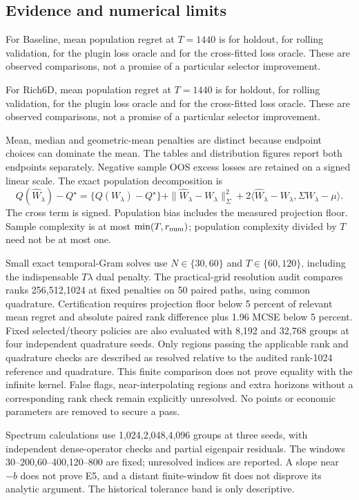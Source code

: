 \subsection{Evidence and numerical limits}
For Baseline, mean population regret at $T=1440$ is \simNumberA{} for holdout, \simNumberB{} for rolling validation, \simNumberC{} for the plugin loss oracle and \simNumberD{} for the cross-fitted loss oracle. These are observed comparisons, not a promise of a particular selector improvement.

For Rich6D, mean population regret at $T=1440$ is \simNumberE{} for holdout, \simNumberF{} for rolling validation, \simNumberG{} for the plugin loss oracle and \simNumberH{} for the cross-fitted loss oracle. These are observed comparisons, not a promise of a particular selector improvement.


Mean, median and geometric-mean penalties are distinct because endpoint choices
can dominate the mean. The tables and distribution figures report both endpoints
separately. Negative sample OOS excess losses are retained on a signed linear
scale. The exact population decomposition is
\[
Q(\widehat W_\lambda)-Q^\star
=\{Q(W_\lambda)-Q^\star\}
+\|\widehat W_\lambda-W_\lambda\|_\Sigma^2
+2\langle\widehat W_\lambda-W_\lambda,\Sigma W_\lambda-\mu\rangle.
\]
The cross term is signed. Population bias includes the measured projection
floor. Sample complexity is at most $\min(T,r_{\rm num})$; population complexity
divided by $T$ need not be at most one.

Small exact temporal-Gram solves use $N\in\{30,60\}$ and $T\in\{60,120\}$,
including the indispensable $T\lambda$ dual penalty. The practical-grid
resolution audit compares ranks 256,512,1024 at fixed penalties on 50 paired
paths, using common quadrature. Certification requires projection floor below
5 percent of relevant mean regret and absolute paired rank difference plus
1.96 MCSE below 5 percent. Fixed selected/theory policies are also evaluated
with 8,192 and 32,768 groups at four independent quadrature seeds.
Only regions passing the applicable rank and quadrature checks are described as
resolved relative to the audited rank-1024 reference and quadrature. This finite
comparison does not prove equality with the infinite kernel. False flags, near-interpolating
regions and extra horizons without a corresponding rank check remain explicitly
unresolved. No points or economic parameters are removed to secure a pass.

Spectrum calculations use 1,024,2,048,4,096 groups at three seeds, with
independent dense-operator checks and partial eigenpair residuals. The windows
30--200,60--400,120--800 are fixed; unresolved indices are reported. A slope
near $-b$ does not prove E5, and a distant finite-window fit does not disprove
its analytic argument. The historical tolerance band is only descriptive.

